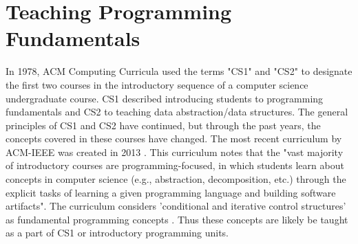 \documentclass[a4paper,11.5pt]{report}
\numberwithin{figure}{section}
\numberwithin{table}{section}
\numberwithin{equation}{section}
\numberwithin{equation}{section}
\begin{document}

\section{Teaching Programming Fundamentals}

In 1978, ACM Computing Curricula used the terms "CS1" and "CS2" to designate the first two courses in the introductory sequence of a computer science undergraduate course. CS1 described introducing students to programming fundamentals and CS2 to teaching data abstraction/data structures. The general principles of CS1 and CS2 have continued, but through the past years, the concepts covered in these courses have changed. The most recent curriculum by ACM-IEEE was created in 2013 \citep{Hertz2010}. This curriculum notes that the "vast majority of introductory courses are programming-focused, in which students learn about concepts in computer science (e.g., abstraction, decomposition, etc.) through the explicit tasks of learning a given programming language and building software artifacts". The curriculum considers 'conditional and iterative control structures' as fundamental programming concepts \citep{acm}. Thus these concepts are likely be taught as a part of CS1 or introductory programming units. %

\end{document}
